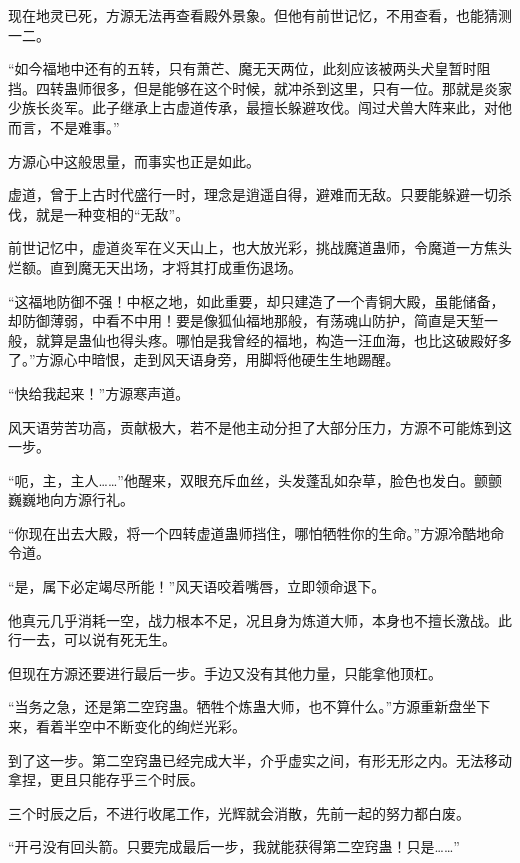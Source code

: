 
\begin{this_body}

现在地灵已死，方源无法再查看殿外景象。但他有前世记忆，不用查看，也能猜测一二。

“如今福地中还有的五转，只有萧芒、魔无天两位，此刻应该被两头犬皇暂时阻挡。四转蛊师很多，但是能够在这个时候，就冲杀到这里，只有一位。那就是炎家少族长炎军。此子继承上古虚道传承，最擅长躲避攻伐。闯过犬兽大阵来此，对他而言，不是难事。”

方源心中这般思量，而事实也正是如此。

虚道，曾于上古时代盛行一时，理念是逍遥自得，避难而无敌。只要能躲避一切杀伐，就是一种变相的“无敌”。

前世记忆中，虚道炎军在义天山上，也大放光彩，挑战魔道蛊师，令魔道一方焦头烂额。直到魔无天出场，才将其打成重伤退场。

“这福地防御不强！中枢之地，如此重要，却只建造了一个青铜大殿，虽能储备，却防御薄弱，中看不中用！要是像狐仙福地那般，有荡魂山防护，简直是天堑一般，就算是蛊仙也得头疼。哪怕是我曾经的福地，构造一汪血海，也比这破殿好多了。”方源心中暗恨，走到风天语身旁，用脚将他硬生生地踢醒。

“快给我起来！”方源寒声道。

风天语劳苦功高，贡献极大，若不是他主动分担了大部分压力，方源不可能炼到这一步。

“呃，主，主人……”他醒来，双眼充斥血丝，头发蓬乱如杂草，脸色也发白。颤颤巍巍地向方源行礼。

“你现在出去大殿，将一个四转虚道蛊师挡住，哪怕牺牲你的生命。”方源冷酷地命令道。

“是，属下必定竭尽所能！”风天语咬着嘴唇，立即领命退下。

他真元几乎消耗一空，战力根本不足，况且身为炼道大师，本身也不擅长激战。此行一去，可以说有死无生。

但现在方源还要进行最后一步。手边又没有其他力量，只能拿他顶杠。

“当务之急，还是第二空窍蛊。牺牲个炼蛊大师，也不算什么。”方源重新盘坐下来，看着半空中不断变化的绚烂光彩。

到了这一步。第二空窍蛊已经完成大半，介乎虚实之间，有形无形之内。无法移动拿捏，更且只能存乎三个时辰。

三个时辰之后，不进行收尾工作，光辉就会消散，先前一起的努力都白废。

“开弓没有回头箭。只要完成最后一步，我就能获得第二空窍蛊！只是……”


\end{this_body}
